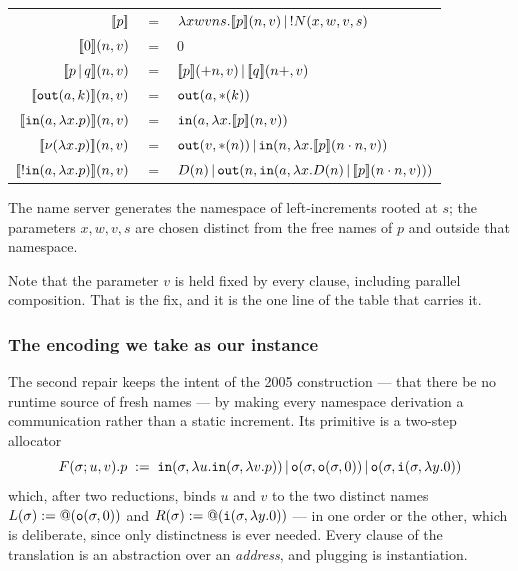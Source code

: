 \documentclass{article}
\begin{document}
\begin{theorem}
    \begin{center}
        \renewcommand{\arraystretch}{1.2}
        \begin{tabular}{rcl}
             $[\![p]\!]$ & $=$ & $\lambda xwvns. [\![p]\!](n,v)\,|\, !N(x,w,v,s)$\\
             $[\![0]\!](n,v)$ & $=$ & $0$\\
             $[\![p\,|\, q]\!](n,v)$ & $=$ & $[\![p]\!](+n,v)\,|\, [\![q]\!](n+, v)$\\
             $[\![\mathtt{out}(a,k)]\!](n,v)$ & $=$ & $\mathtt{out}(a,\ast(k))$\\
             $[\![\mathtt{in}(a,\lambda x.p)]\!](n,v)$ & $=$ & $\mathtt{in}(a,\lambda x.[\![p]\!](n,v))$\\
             $[\![\nu(\lambda x.p)]\!](n,v)$ & $=$ & $\mathtt{out}(v,\ast(n))\,|\, \mathtt{in}(n,\lambda x.[\![p]\!](n\cdot n,v))$\\
             $[\![!\mathtt{in}(a,\lambda x.p)]\!](n,v)$ & $=$ & $D(n)\,|\, \mathtt{out}(n, \mathtt{in}(a, \lambda x. D(n)\,|\, [\![p]\!](n\cdot n, v)))$
        \end{tabular}
    \end{center}
    The name server generates the namespace of left-increments rooted at $s$; the parameters $x,w,v,s$ are chosen distinct from the free names of $p$ and outside that namespace.
\end{theorem}

Note that the parameter $v$ is held fixed by every clause, including parallel composition. That is the fix, and it is the one line of the table that carries it.

\subsubsection*{The encoding we take as our instance}

The second repair \citep{nowns} keeps the intent of the 2005 construction --- that there be no runtime source of fresh names --- by making every namespace derivation a communication rather than a static increment. Its primitive is a two-step allocator
\[F(\sigma;u,v).p \;:=\; \mathtt{in}(\sigma,\lambda u.\mathtt{in}(\sigma,\lambda v.p))\,|\, \mathtt{o}(\sigma,\mathtt{o}(\sigma,0))\,|\, \mathtt{o}(\sigma,\mathtt{i}(\sigma,\lambda y.0))\]
which, after two reductions, binds $u$ and $v$ to the two distinct names $L(\sigma):=@(\mathtt{o}(\sigma,0))$ and $R(\sigma):=@(\mathtt{i}(\sigma,\lambda y.0))$ --- in one order or the other, which is deliberate, since only distinctness is ever needed. Every clause of the translation is an abstraction over an \emph{address}, and plugging is instantiation.
\end{document}
